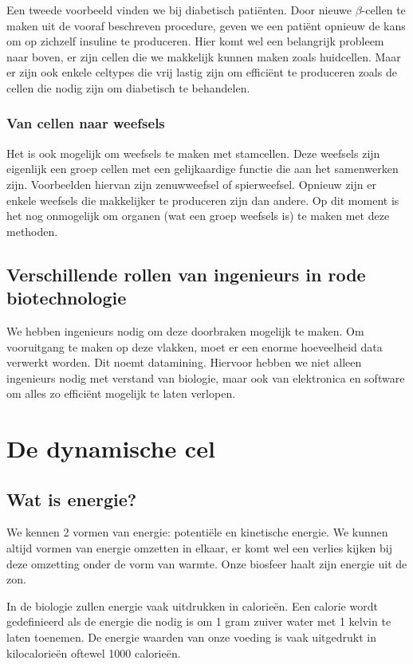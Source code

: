 \documentclass[a4paper,kul]{kulakarticle} %
\begin{document}
Een tweede voorbeeld vinden we bij diabetisch patiënten. Door nieuwe $\beta$-cellen te maken uit de vooraf beschreven procedure, geven we een patiënt opnieuw de kans om op zichzelf insuline te produceren. Hier komt wel een belangrijk probleem naar boven, er zijn cellen die we makkelijk kunnen maken zoals huidcellen. Maar er zijn ook enkele celtypes die vrij lastig zijn om efficiënt te produceren zoals de cellen die nodig zijn om diabetisch te behandelen. 
\subsubsection{Van cellen naar weefsels}
Het is ook mogelijk om weefsels te maken met stamcellen. Deze weefsels zijn eigenlijk een groep cellen met een gelijkaardige functie die aan het samenwerken zijn. Voorbeelden hiervan zijn zenuwweefsel of spierweefsel. Opnieuw zijn er enkele weefsels die makkelijker te produceren zijn dan andere. Op dit moment is het nog onmogelijk om organen (wat een groep weefsels is) te maken met deze methoden. 
\subsection[Ingenieurs in rode biotechnologie]{Verschillende rollen van ingenieurs in rode biotechnologie}
We hebben ingenieurs nodig om deze doorbraken mogelijk te maken. Om vooruitgang te maken op deze vlakken, moet er een enorme hoeveelheid data verwerkt worden. Dit noemt datamining. Hiervoor hebben we niet alleen ingenieurs nodig met verstand van biologie, maar ook van elektronica en software om alles zo efficiënt mogelijk te laten verlopen.  
\section{De dynamische cel}
\subsection{Wat is energie?}
We kennen 2 vormen van energie: potentiële en kinetische energie. We kunnen altijd vormen van energie omzetten in elkaar, er komt wel een verlies kijken bij deze omzetting onder de vorm van warmte. Onze biosfeer haalt zijn energie uit de zon.

In de biologie zullen energie vaak uitdrukken in calorieën. Een calorie wordt gedefinieerd als de energie die nodig is om 1 gram zuiver water met 1 kelvin te laten toenemen. De energie waarden van onze voeding is vaak uitgedrukt in kilocalorieën oftewel 1000 calorieën. 
\newpage
\end{document}
